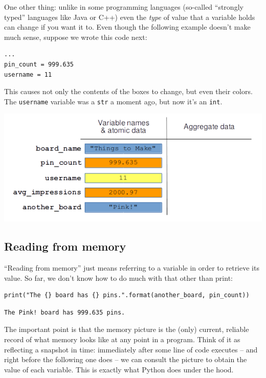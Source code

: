 One other thing: unlike in some programming languages (so-called ``strongly
typed'' languages like Java or C++) even the \textit{type} of value that a
variable holds can change if you want it to. Even though the following example
doesn't make much sense, suppose we wrote this code next:

\begin{Verbatim}[fontsize=\small,samepage=true,frame=single,framesep=3mm]
...
pin_count = 999.635
username = 11
\end{Verbatim}

This causes not only the contents of the boxes to change, but even their
colors. The \texttt{username} variable was a \texttt{str} a moment ago, but now
it's an \texttt{int}.

\vspace{-.2in}
\begin{center}
\includegraphics[width=.7\textwidth]{memoryPicture5.png}
\end{center}

\subsection{Reading from memory}

``Reading from memory'' just means referring to a variable in order to retrieve
its value. So far, we don't know how to do much with that other than print:

\begin{Verbatim}[fontsize=\small,samepage=true,frame=single,framesep=3mm]
print("The {} board has {} pins.".format(another_board, pin_count))
\end{Verbatim}

\begin{Verbatim}[fontsize=\small,samepage=true,frame=leftline,framesep=5mm,framerule=1mm]
The Pink! board has 999.635 pins.
\end{Verbatim}

The important point is that the memory picture is the (only) current, reliable
record of what memory looks like at any point in a program. Think of it as
reflecting a snapshot in time: immediately after some line of code executes --
and right before the following one does -- we can consult the picture to obtain
the value of each variable. This is exactly what Python does under the hood.

